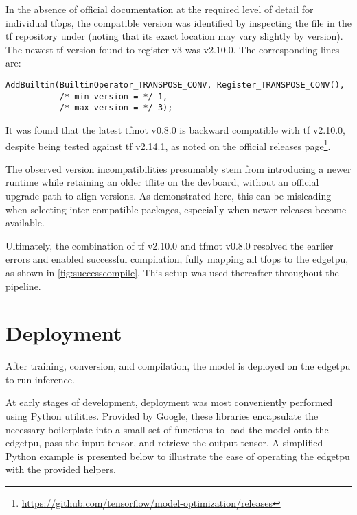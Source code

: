 {In the absence of official documentation at the required level of detail for individual \glspl{tfop},
the compatible  version was identified by inspecting the  file in
the \gls{tf} repository under  (noting that its exact location may vary slightly by version).
The newest \gls{tf} version found to register  v3 was v2.10.0.
The corresponding  lines are:

\begin{lstlisting}
AddBuiltin(BuiltinOperator_TRANSPOSE_CONV, Register_TRANSPOSE_CONV(),
           /* min_version = */ 1,
           /* max_version = */ 3);
\end{lstlisting}

It was found that the latest \gls{tfmot} v0.8.0 is backward compatible with \gls{tf} v2.10.0,
despite being tested against \gls{tf} v2.14.1, as noted on the official releases page\footnote{\url{https://github.com/tensorflow/model-optimization/releases}}.

The observed version incompatibilities presumably stem from introducing a newer  runtime while retaining an older \gls{tflite} on the \gls{devboard},
without an official upgrade path to align versions. As demonstrated here, this can be misleading when selecting inter-compatible packages, especially when newer releases become available.

Ultimately, the combination of \gls{tf} v2.10.0 and \gls{tfmot} v0.8.0 resolved the earlier errors and enabled successful compilation,
fully mapping all \glspl{tfop} to the \gls{edgetpu}, as shown in \autoref{fig:successcompile}. This setup was used thereafter throughout the pipeline.

\section{Deployment}
\label{sec:deployment}

After training, conversion, and compilation, the  model is deployed on the \gls{edgetpu} to run inference.

At early stages of development, deployment was most conveniently performed using Python utilities.
Provided by Google, these libraries encapsulate the necessary boilerplate into a small set of functions to load the model onto the \gls{edgetpu},
pass the input tensor, and retrieve the output tensor.
A simplified Python example is presented below to illustrate the ease of operating the \gls{edgetpu} with the provided helpers.

}
